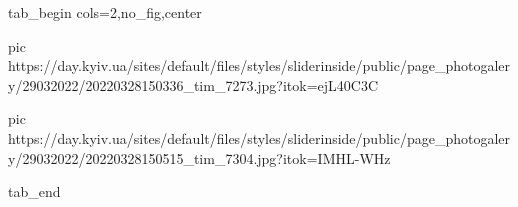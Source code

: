  
 
 
 
 

\ifcmt
  tab_begin cols=2,no_fig,center

     pic https://day.kyiv.ua/sites/default/files/styles/sliderinside/public/page_photogalery/29032022/20220328150336_tim_7273.jpg?itok=ejL40C3C

		 pic https://day.kyiv.ua/sites/default/files/styles/sliderinside/public/page_photogalery/29032022/20220328150515_tim_7304.jpg?itok=IMHL-WHz

  tab_end
\fi
